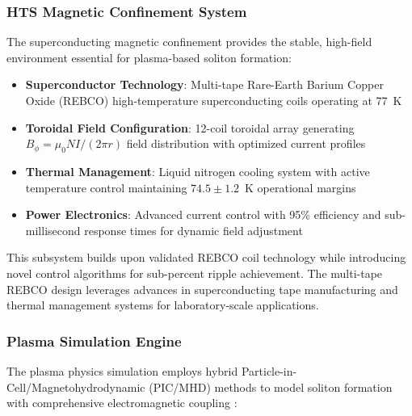 \documentclass[12pt,a4paper]{article}
\begin{document}
\subsubsection{HTS Magnetic Confinement System}

The superconducting magnetic confinement provides the stable, high-field environment essential for plasma-based soliton formation:

\begin{itemize}
\item \textbf{Superconductor Technology}: Multi-tape Rare-Earth Barium Copper Oxide (REBCO) high-temperature superconducting coils operating at 77~K
\item \textbf{Toroidal Field Configuration}: 12-coil toroidal array generating $B_\phi = \mu_0 NI/(2\pi r)$ field distribution with optimized current profiles
\item \textbf{Thermal Management}: Liquid nitrogen cooling system with active temperature control maintaining $74.5 \pm 1.2$~K operational margins
\item \textbf{Power Electronics}: Advanced current control with 95\% efficiency and sub-millisecond response times for dynamic field adjustment
\end{itemize}

This subsystem builds upon validated REBCO coil technology \cite{senatore2014progress,malozemoff2008progress,larbalestier2014hts} while introducing novel control algorithms for sub-percent ripple achievement. The multi-tape REBCO design leverages advances in superconducting tape manufacturing \cite{wesson2011tokamaks} and thermal management systems \cite{chen2016plasma,freidberg2014plasma} for laboratory-scale applications.

\subsubsection{Plasma Simulation Engine}

The plasma physics simulation employs hybrid Particle-in-Cell/Magnetohydrodynamic (PIC/MHD) methods to model soliton formation with comprehensive electromagnetic coupling \cite{Maxwell1865,freidberg2014plasma}:
\end{document}
